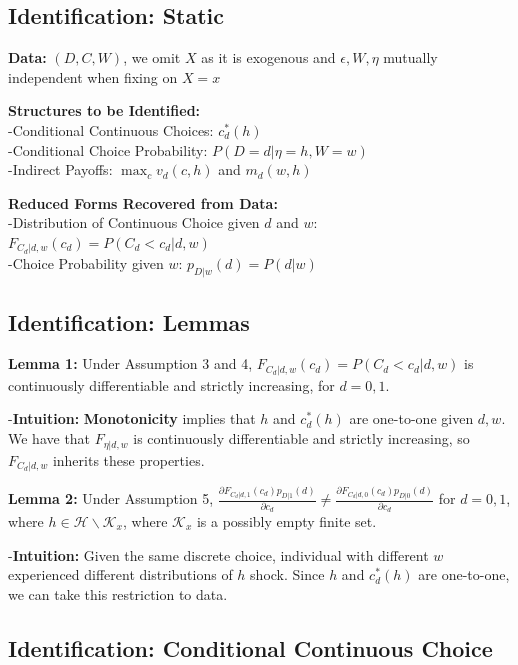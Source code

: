\documentclass[
  letterpaper,
  DIV=11,
  numbers=noendperiod]{scrartcl}
\begin{document}
\subsection{Identification: Static}\label{identification-static}

\textbf{Data:} \((D,C,W)\), we omit \(X\) as it is exogenous and
\(\epsilon,W,\eta\) mutually independent when fixing on \(X=x\)

\textbf{Structures to be Identified:}\\
-Conditional Continuous Choices: \(c^{*}_d(h)\)\\
-Conditional Choice Probability: \(P(D = d | \eta = h, W = w)\)\\
-Indirect Payoffs: \(\max_{c}v_d(c,h)\) and \(m_d(w,h)\)

\textbf{Reduced Forms Recovered from Data:}\\
-Distribution of Continuous Choice given \(d\) and \(w\):
\(F_{C_d|d,w}(c_d) = P(C_d < c_d | d, w)\)\\
-Choice Probability given \(w\): \(p_{D|w}(d) = P(d|w)\)

\subsection{Identification: Lemmas}\label{identification-lemmas}

\textbf{Lemma 1:} Under Assumption 3 and 4,
\(F_{C_d|d,w}(c_d) = P(C_d < c_d| d, w)\) is continuously differentiable
and strictly increasing, for \(d = 0,1\).

-\textbf{Intuition:} \textbf{Monotonicity} implies that \(h\) and
\(c^{*}_d(h)\) are one-to-one given \(d,w\). We have that
\(F_{\eta|d,w}\) is continuously differentiable and strictly increasing,
so \(F_{C_d|d,w}\) inherits these properties.

\textbf{Lemma 2:} Under Assumption 5,
\(\frac{\partial F_{C_d|d,1}(c_d)p_{D|1}(d)}{\partial c_d} \neq \frac{\partial F_{C_d|d,0}(c_d)p_{D|0}(d)}{\partial c_d}\)
for \(d = 0,1\), where \(h \in \mathcal{H} \backslash \mathcal{K}_x\),
where \(\mathcal{K}_x\) is a possibly empty finite set.

-\textbf{Intuition:} Given the same discrete choice, individual with
different \(w\) experienced different distributions of \(h\) shock.
Since \(h\) and \(c^{*}_d(h)\) are one-to-one, we can take this
restriction to data.

\subsection{Identification: Conditional Continuous
Choice}\label{identification-conditional-continuous-choice}
\end{document}
